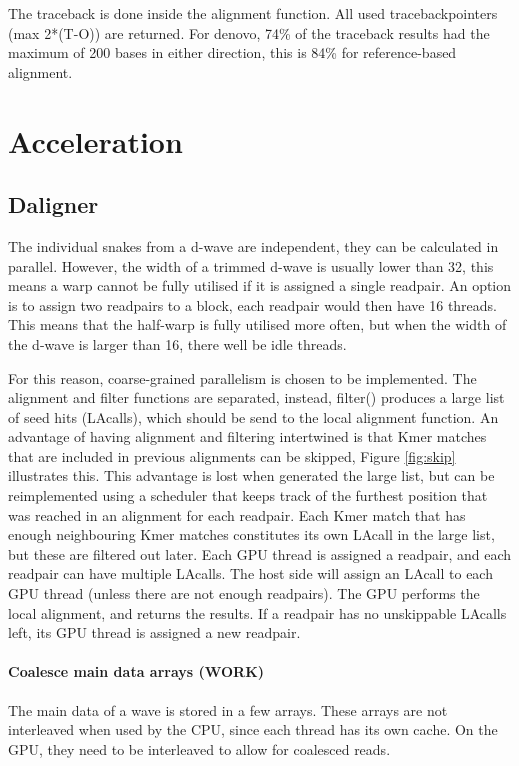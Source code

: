 \documentclass[../main/thesis.tex]{subfiles}
\begin{document}
The traceback is done inside the alignment function.
All used tracebackpointers (max 2*(T-O)) are returned.
For denovo, 74\% of the traceback results had the maximum of 200 bases in either direction, this is 84\% for reference-based alignment.



\section{Acceleration}
\subsection{Daligner}
The individual snakes from a d-wave are independent, they can be calculated in parallel.
However, the width of a trimmed d-wave is usually lower than 32, this means a warp cannot be fully utilised if it is assigned a single readpair.
An option is to assign two readpairs to a block, each readpair would then have 16 threads.
This means that the half-warp is fully utilised more often, but when the width of the d-wave is larger than 16, there well be idle threads.

For this reason, coarse-grained parallelism is chosen to be implemented.
The alignment and filter functions are separated, instead, filter() produces a large list of seed hits (LAcalls), which should be send to the local alignment function.
An advantage of having alignment and filtering intertwined is that Kmer matches that are included in previous alignments can be skipped, Figure \ref{fig:skip} illustrates this.
This advantage is lost when generated the large list, but can be reimplemented using a scheduler that keeps track of the furthest position that was reached in an alignment for each readpair.
Each Kmer match that has enough neighbouring Kmer matches constitutes its own LAcall in the large list, but these are filtered out later.
Each GPU thread is assigned a readpair, and each readpair can have multiple LAcalls.
The host side will assign an LAcall to each GPU thread (unless there are not enough readpairs).
The GPU performs the local alignment, and returns the results.
If a readpair has no unskippable LAcalls left, its GPU thread is assigned a new readpair.



\paragraph{Coalesce main data arrays (WORK)}
The main data of a wave is stored in a few arrays.
These arrays are not interleaved when used by the CPU, since each thread has its own cache.
On the GPU, they need to be interleaved to allow for coalesced reads.
\end{document}
